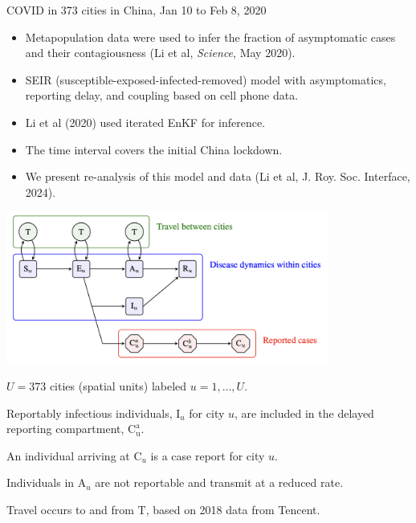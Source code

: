 \documentclass{beamer}
\begin{document}
\begin{frame}{COVID in 373 cities in China, Jan 10 to Feb 8, 2020}

  \begin{itemize}
  \item Metapopulation data were used to infer the fraction of asymptomatic cases and their contagiousness
    (Li et al, {\it Science}, May 2020).
  \item SEIR (susceptible-exposed-infected-removed) model with asymptomatics, reporting delay, and coupling based on cell phone data.
  \item Li et al (2020) used iterated EnKF for inference.
  \item The time interval covers the initial China lockdown.
  \item We present re-analysis of this model and data (Li et al, {J. Roy. Soc. Interface}, 2024).

\end{itemize}     

\end{frame}

\begin{frame}
  \begin{center}
      \begin{center}
    \includegraphics[height=5cm]{seair.png}
    \end{center}

\end{center}
  \bi
  \item $U=373$ cities (spatial units) labeled $u=1,\dots,U$.
\item 
  Reportably infectious individuals, $\mathrm{I}_u$ for city $u$, are included in the delayed reporting compartment, $\mathrm{C^a_u}$.
  \item 
An individual arriving at $\mathrm{C}_u$ is a case report for city $u$.
\item
  Individuals in $\mathrm{A}_u$ are not reportable and transmit at a reduced rate.
  \item 
Travel occurs to and from $\mathrm{T}$, based on 2018 data from Tencent.
\ei

\end{frame}
\end{document}

